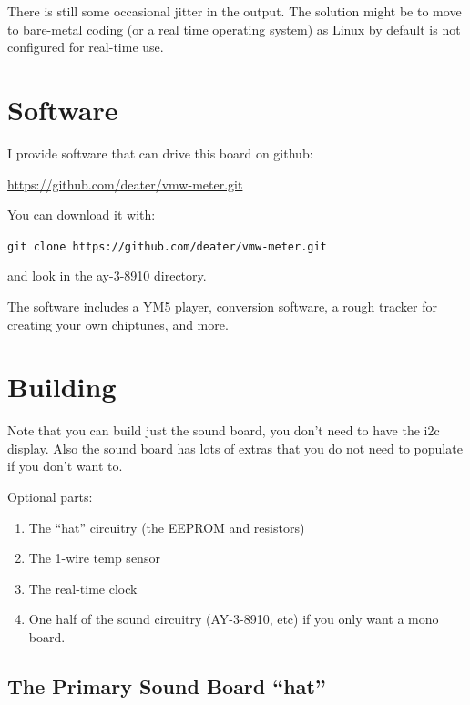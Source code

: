 \documentclass[11pt]{article}
\begin{document}
There is still some occasional jitter in the output.
The solution might be to move to bare-metal coding (or a real time operating
system) as Linux by default is not configured for real-time use.





\section{Software}

I provide software that can drive this board on github:

\url{https://github.com/deater/vmw-meter.git}

\noindent
You can download it with:

{\tt git clone https://github.com/deater/vmw-meter.git}

\noindent
and look in the ay-3-8910 directory.

The software includes a YM5 player, conversion software, a rough tracker
for creating your own chiptunes, and more.



\section{Building}

Note that you can build just the sound board, you don't need to have the i2c display.
Also the sound board has lots of extras that you do not need to populate if you don't want to.

Optional parts:
\begin{enumerate}
	\item The ``hat'' circuitry (the EEPROM and resistors)
	\item The 1-wire temp sensor
	\item The real-time clock
	\item One half of the sound circuitry (AY-3-8910, etc) if you only want
		a mono board.
\end{enumerate}


\subsection{The Primary Sound Board ``hat''}
\end{document}
